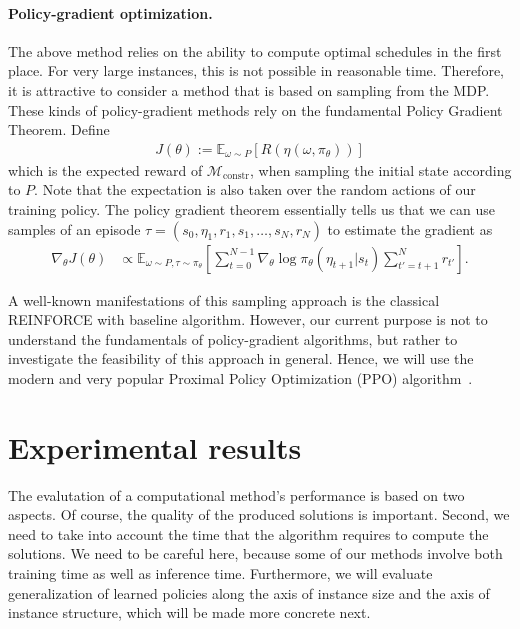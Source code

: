 \documentclass[a4paper]{report}
\theoremstyle{definition}
\theoremstyle{plain}
\begin{document}
\paragraph{Policy-gradient optimization.}

The above method relies on the ability to compute optimal schedules in the first
place. For very large instances, this is not possible in reasonable time.
Therefore, it is attractive to consider a method that is based on sampling from
the MDP. These kinds of policy-gradient methods rely on the fundamental Policy
Gradient Theorem.
%
Define
\begin{align}
  J(\theta) := \mathbb{E}_{\omega \sim P}[R(\eta(\omega, \pi_\theta))] 
\end{align}
which is the expected reward of $\mathcal{M}_\mathrm{constr}$, when sampling the
initial state according to $P$.
Note that the expectation is also taken over the random actions of our training policy.
%
The policy gradient theorem essentially tells us that we can use samples of an
episode $\tau = (s_0, \eta_1, r_1, s_1, \dots, s_N, r_N)$ to estimate the gradient as
%
\begin{align}
  \nabla_\theta J(\theta) &\propto \mathbb{E}_{\omega \sim P, \tau \sim \pi_\theta} \left[ \sum_{t=0}^{N-1} \nabla_\theta \log \pi_\theta(\eta_{t+1} | s_{t}) \sum_{t'=t+1}^{N} r_{t'}  \right]  .
\end{align}

A well-known manifestations of this sampling approach is the classical REINFORCE
with baseline algorithm. However, our current purpose is not to understand the
fundamentals of policy-gradient algorithms, but rather to investigate the
feasibility of this approach in general. Hence, we will use the modern and very
popular Proximal Policy Optimization (PPO) algorithm~\cite{schulmanProximalPolicyOptimization2017}.


\section{Experimental results}\label{sec:results}

The evalutation of a computational method's performance is based on two aspects.
Of course, the quality of the produced solutions is important. Second, we need
to take into account the time that the algorithm requires to compute the
solutions. We need to be careful here, because some of our methods involve both
training time as well as inference time.
Furthermore, we will evaluate generalization of learned policies along the axis
of instance size and the axis of instance structure, which will be made more
concrete next.
\end{document}
